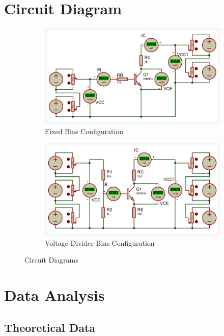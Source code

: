 \documentclass[12pt]{article}
\begin{document}
\section{Circuit Diagram}
\begin{figure}[h!]
    \centering
    \begin{subfigure}{0.45\textwidth}
        \includegraphics[width=0.9\linewidth]{Fixed_Bias.png}
        \caption{Fixed Bias Configuration}
    \end{subfigure}
    \begin{subfigure}{0.45\textwidth}
        \includegraphics[width=0.9\linewidth]{Voltage_Divider_Bias.png}
        \caption{Voltage Divider Bias Configuration}
    \end{subfigure}
    \caption{Circuit Diagrams}
\end{figure}

\newpage
\section{Data Analysis}
\subsection{Theoretical Data}
\end{document}
